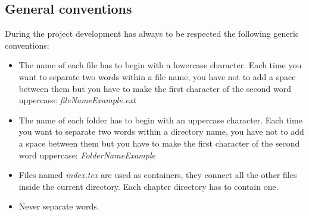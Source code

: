 \subsection{General conventions}
During the project development has always to be respected the following generic conventions:
\begin{itemize}
  \item The name of each file has to begin with a lowercase character. Each time you want to separate two words within a file name, you have not to add a space between them but you have to make the first character of the second word uppercase: \textit{fileNameExample.ext}
  \item The name of each folder has to begin with an uppercase character. Each time you want to separate two words within a directory name, you have not to add a space between them but you have to make the first character of the second word uppercase: \textit{FolderNameExample}
  \item Files named \textit{index.tex} are used as containers, they connect all the other files inside the current directory. Each chapter directory has to contain one.
  \item Never separate words.
\end{itemize}
